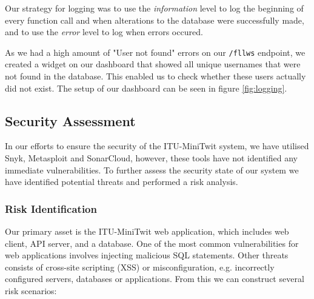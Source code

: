 Our strategy for logging was to use the \textit{information} level to log the beginning of every function call and when alterations to the database were successfully made, and to use the \textit{error} level to log when errors occured.

As we had a high amount of "User not found" errors on our \texttt{/fllws} endpoint, we created a widget on our dashboard that showed all unique usernames that were not found in the database. 
This enabled us to check whether these users actually did not exist.
The setup of our dashboard can be seen in figure \ref{fig:logging}.


\subsection{Security Assessment}
In our efforts to ensure the security of the ITU-MiniTwit system, we have utilised Snyk, Metasploit and SonarCloud, however, these tools have not identified any immediate vulnerabilities. To further assess the security state of our system we have identified potential threats and performed a risk analysis.

\subsubsection*{Risk Identification}
Our primary asset is the ITU-MiniTwit web application, which includes web client, API server, and a database.
One of the most common vulnerabilities for web applications involves injecting malicious SQL statements. Other threats consists of cross-site scripting (XSS) or misconfiguration, e.g. incorrectly configured servers, databases or applications.
From this we can construct several risk scenarios:

